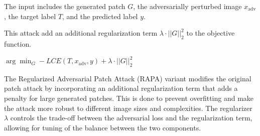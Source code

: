 The input includes the generated patch $G$, the adversarially perturbed image $x_{\text{adv}}$, the target label $T$, and the predicted label $y$.

This attack add an additional regularization term $\lambda \cdot ||G||_2^2$ to the objective function.

$\arg\min_{G} -LCE(T, x_{\text{adv}}, y) + \lambda \cdot ||G||_2^2$

The Regularized Adversarial Patch Attack (RAPA) variant modifies the original patch attack by incorporating an additional regularization term that adds a penalty for large generated patches. This is done to prevent overfitting and make the attack more robust to different image sizes and complexities. The regularizer $\lambda$ controls the trade-off between the adversarial loss and the regularization term, allowing for tuning of the balance between the two components.